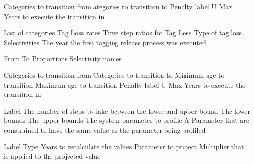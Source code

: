  {}
\par\textbf{}\par
{} {Categories to transition from}
 {ategories to transition to}
 {Penalty label}
 {U Max}
 {Years to execute the transition in}
 {}
 {}
 {}
 {}
\par\textbf{}\par
{} {List of categories}
 {Tag Loss rates}
 {Time step ratios for Tag Loss}
 {Type of tag loss}
 {Selectivities}
 {The year the first tagging release process was executed}
\par\textbf{}\par
{} {From}
 {To}
 {Proportions}
 {Selectivity names}
\par\textbf{}\par
{} {Categories to transition from}
 {Categories to transition to}
 {Minimum age to transition}
 {Maximum age to transition}
 {Penalty label}
 {U Max}
 {Years to execute the transition in}
\par\par
{} {Label}
 {The number of steps to take between the lower and upper bound}
 {The lower bounds}
 {The upper bounds}
 {The system parameter to profile}
 {A Parameter that are constrained to have the same value as the parameter being profiled}
\par\par
{} {Label}
 {Type}
 {Years to recalculate the values}
 {Parameter to project}
 {Multiplier that is applied to the projected value}
\par\par
